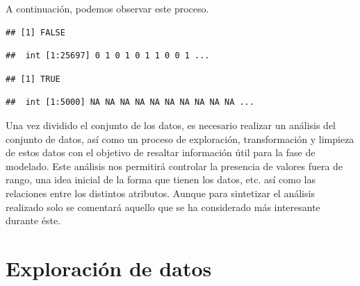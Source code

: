 \documentclass[
]{article}
\newenvironment{Shaded}{\begin{snugshade}}{\end{snugshade}}
\newcommand{\KeywordTok}[1]{\textcolor[rgb]{0.13,0.29,0.53}{\textbf{#1}}}
\newcommand{\NormalTok}[1]{#1}
\newcommand{\OperatorTok}[1]{\textcolor[rgb]{0.81,0.36,0.00}{\textbf{#1}}}
\newcommand{\StringTok}[1]{\textcolor[rgb]{0.31,0.60,0.02}{#1}}
\begin{document}
A continuación, podemos observar este proceso.

\begin{Shaded}
\end{Shaded}

\begin{verbatim}
## [1] FALSE
\end{verbatim}

\begin{verbatim}
##  int [1:25697] 0 1 0 1 0 1 1 0 0 1 ...
\end{verbatim}

\begin{Shaded}
\end{Shaded}

\begin{verbatim}
## [1] TRUE
\end{verbatim}

\begin{verbatim}
##  int [1:5000] NA NA NA NA NA NA NA NA NA NA ...
\end{verbatim}

Una vez dividido el conjunto de los datos, es necesario realizar un
análisis del conjunto de datos, así como un proceso de exploración,
transformación y limpieza de estos datos con el objetivo de resaltar
información útil para la fase de modelado. Este análisis nos permitirá
controlar la presencia de valores fuera de rango, una idea inicial de la
forma que tienen los datos, etc. así como las relaciones entre los
distintos atributos. Aunque para sintetizar el análisis realizado solo
se comentará aquello que se ha considerado más interesante durante éste.

\hypertarget{exploraciuxf3n-de-datos}{%
\section{\texorpdfstring{\textbf{Exploración de
datos}}{Exploración de datos}}\label{exploraciuxf3n-de-datos}}
\end{document}
